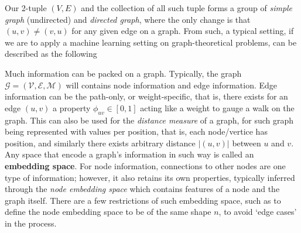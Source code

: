 \documentclass{article}
\begin{document}
Our 2-tuple $(V,E)$ and the collection of all such tuple forms a group of \textit{simple graph} (undirected) and \textit{directed graph}, where the only change is that $(u,v)\neq (v,u)$ for any given edge on a graph. From such, a typical setting, if we are to apply a machine learning setting on graph-theoretical problems, can be described as the following



Much information can be packed on a graph. Typically, the graph $\mathcal{G}= (\mathcal{V},\mathcal{E},\mathcal{M})$ will contains node information and edge information. Edge information can be the path-only, or weight-specific, that is, there exists for an edge $(u,v)$ a property $\phi_{uv}\in [0,1]$ acting like a weight to gauge a walk on the graph. This can also be used for the \textit{distance measure} of a graph, for such graph being represented with values per position, that is, each node/vertice has position, and similarly there exists arbitrary distance $\lvert (u,v)\rvert$ between $u$ and $v$. Any space that encode a graph's information in such way is called an \textbf{embedding space}. For node information, connections to other nodes are one type of information; however, it also retains its own properties, typically inferred through the \textit{node embedding space} which contains features of a node and the graph itself. There are a few restrictions of such embedding space, such as to define the node embedding space to be of the same shape $n$, to avoid `edge cases' in the process. 
\end{document}
